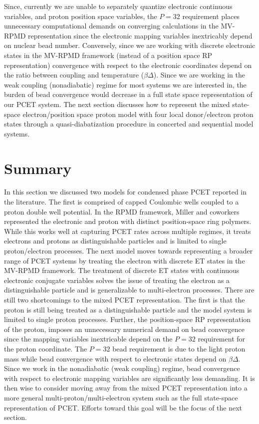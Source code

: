 \documentclass[phd,tocprelim]{cornell}
\begin{document}
Since, currently we are unable to separately quantize electronic continuous variables, and proton position space variables, the $P=32$ requirement places unnecessary computational demands on converging calculations in the MV-RPMD representation since the electronic mapping variables inextricably depend on nuclear bead number. Conversely, since we are working with discrete electronic states in the MV-RPMD framework (instead of a position space RP representation) convergence with respect to the electronic coordinates depend on the ratio between coupling and temperature ($\beta\Delta$). Since we are working in the weak coupling (nonadiabatic) regime for most systems we are interested in, the burden of bead convergence would decrease in a full state space representation of our PCET system. The next section discusses how to represent the mixed state-space electron/position space proton model with four local donor/electron proton states through a quasi-diabatization procedure in concerted and sequential model systems. 


\section{Summary}
In this section we discussed two models for condensed phase PCET reported in the literature. The first is comprised of  capped Coulombic wells coupled to a proton double well potential. In the RPMD framework, Miller and coworkers represented the electronic and proton with distinct position-space ring polymers. While this works well at capturing PCET rates across multiple regimes, it treats electrons and protons as distinguishable particles and is limited to single proton/electron processes. The next model moves towards representing a broader range of PCET systems by treating the electron with discrete ET states in the MV-RPMD framework. The treatment of discrete ET states with continuous electronic conjugate variables solves the issue of treating the electron as a distinguishable particle and is generalizable to multi-electron processes. There are still two shortcomings to the mixed PCET representation. The first is that the proton is still being treated as a distinguishable particle and the model system is limited to single proton processes. Further, the position-space RP representation of the proton, imposes an unnecessary numerical demand on bead convergence since the mapping variables inextricable depend on the $P=32$ requirement for the proton coordinate. The $P=32$  bead requirement is due to the light proton mass while bead convergence with respect to electronic states depend on $\beta\Delta$. Since we work in the nonadiabatic (weak coupling) regime, bead convergence with respect to electronic mapping variables are significantly less demanding. It is then wise to consider moving away from the mixed PCET representation into a more general multi-proton/multi-electron system such as the full state-space representation of PCET. Efforts toward this goal will be the focus of the next section. 
\end{document}
